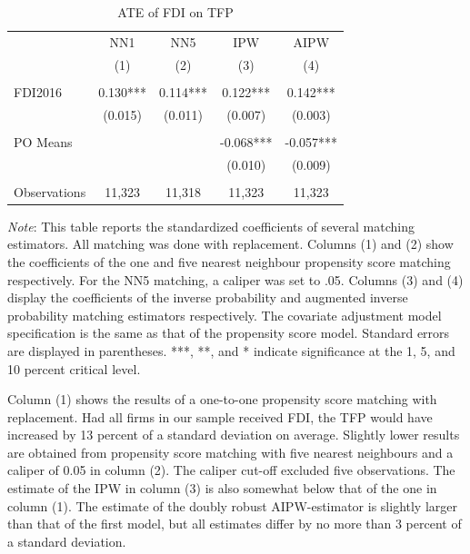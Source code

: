 \documentclass[a4paper,11pt]{scrartcl}
\begin{document}
\begin{table}[h!]
 	\centering
   	\caption{ATE of FDI on TFP}
   	\label{tab:mainresults}
\begin{threeparttable}
	
 \begin{tabular}{l*{4}{c}}
	\hline
	\hline
 			& NN1 & NN5 & IPW & AIPW \\
 			& (1) & (2) & (3)  & (4) \\ \hline
 			&  &  &  &    \\
FDI2016 	& 0.130*** & 0.114*** & 0.122***  & 0.142***   \\
 			& (0.015) & (0.011) & (0.007) &   (0.003)  \\
 	&  &  &  &    \\
PO Means 	& & & -0.068*** &  -0.057*** \\
			&  &  & (0.010)  &  (0.009) \\
			&  &  &  &    \\
 Observations & 11,323 & 11,318 & 11,323 & 11,323 \\ 
 	\hline
 	\hline 
\end{tabular}

\begin{tablenotes}[flushleft]
      \footnotesize
\item \textit{Note}: This table reports the standardized coefficients of several matching estimators. All matching was done with replacement. Columns (1) and (2) show the coefficients of the one and five nearest neighbour propensity score matching respectively. For the NN5 matching, a caliper was set to .05. Columns (3) and (4) display the coefficients of the inverse probability and augmented inverse probability matching estimators respectively. The covariate adjustment model specification is the same as that of the propensity score model. Standard errors are displayed in parentheses. ***, **, and * indicate significance at the 1, 5, and 10 percent critical level.

\end{tablenotes}

\end{threeparttable}
\end{table}

Column (1) shows the results of a one-to-one propensity score matching with replacement.%
 Had all firms in our sample received FDI, the TFP would have increased by 13 percent of a standard deviation on average. Slightly lower results are obtained from propensity score matching with five nearest neighbours %
and a caliper of 0.05 in column (2). The caliper cut-off excluded five observations. The estimate of the IPW in column (3) is also somewhat below that of the one in column (1). The estimate of the doubly robust AIPW-estimator is slightly larger than that of the first model, but all estimates differ by no more than 3 percent of a standard deviation.
\end{document}
